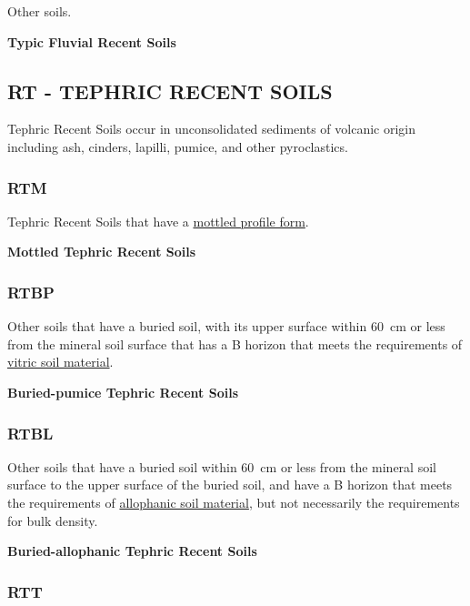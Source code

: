 \documentclass[
  letterpaper,
  DIV=11,
  numbers=noendperiod]{scrreprt}
\begin{document}
Other soils.

\textbf{Typic Fluvial Recent Soils}

\hypertarget{sec-RT}{%
\subsection{\texorpdfstring{\textbf{RT} - TEPHRIC RECENT
SOILS}{RT - TEPHRIC RECENT SOILS}}\label{sec-RT}}

Tephric Recent Soils occur in unconsolidated sediments of volcanic
origin including ash, cinders, lapilli, pumice, and other pyroclastics.

\hypertarget{sec-key-RTM}{%
\subsubsection{\texorpdfstring{\textbf{RTM}}{RTM}}\label{sec-key-RTM}}

Tephric Recent Soils that have a
\protect\hyperlink{sec-diag-mottpf}{mottled profile form}.

\textbf{Mottled Tephric Recent Soils}

\hypertarget{sec-key-RTBP}{%
\subsubsection{\texorpdfstring{\textbf{RTBP}}{RTBP}}\label{sec-key-RTBP}}

Other soils that have a buried soil, with its upper surface within 60~cm
or less from the mineral soil surface that has a B horizon that meets
the requirements of \protect\hyperlink{sec-diag-vitr}{vitric soil
material}.

\textbf{Buried-pumice Tephric Recent Soils}

\hypertarget{sec-key-RTBL}{%
\subsubsection{\texorpdfstring{\textbf{RTBL}}{RTBL}}\label{sec-key-RTBL}}

Other soils that have a buried soil within 60~cm or less from the
mineral soil surface to the upper surface of the buried soil, and have a
B horizon that meets the requirements of
\protect\hyperlink{sec-diag-alloph}{allophanic soil material}, but not
necessarily the requirements for bulk density.

\textbf{Buried-allophanic Tephric Recent Soils}

\hypertarget{sec-key-RTT}{%
\subsubsection{\texorpdfstring{\textbf{RTT}}{RTT}}\label{sec-key-RTT}}
\end{document}
